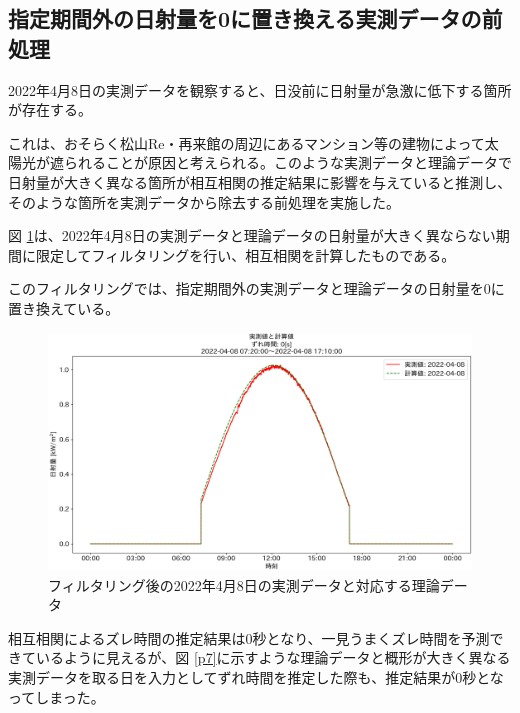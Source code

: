 \documentclass[a4j,12pt,]{jarticle}
\begin{document}
\subsection{指定期間外の日射量を0に置き換える実測データの前処理}
2022年4月8日の実測データを観察すると、日没前に日射量が急激に低下する箇所が存在する。

これは、おそらく松山Re・再来館の周辺にあるマンション等の建物によって太陽光が遮られることが原因と考えられる。このような実測データと理論データで日射量が大きく異なる箇所が相互相関の推定結果に影響を与えていると推測し、そのような箇所を実測データから除去する前処理を実施した。

図 \ref{p6}は、2022年4月8日の実測データと理論データの日射量が大きく異ならない期間に限定してフィルタリングを行い、相互相関を計算したものである。

このフィルタリングでは、指定期間外の実測データと理論データの日射量を0に置き換えている。

\begin{figure}[H]
  \begin{center}
    \includegraphics[width=160mm]{2022-04-08_partial_corr.png}
    \caption{フィルタリング後の2022年4月8日の実測データと対応する理論データ}
    \label{p6}
  \end{center}
\end{figure}

相互相関によるズレ時間の推定結果は0秒となり、一見うまくズレ時間を予測できているように見えるが、図 \ref{p7}に示すような理論データと概形が大きく異なる実測データを取る日を入力としてずれ時間を推定した際も、推定結果が0秒となってしまった。
\end{document}
